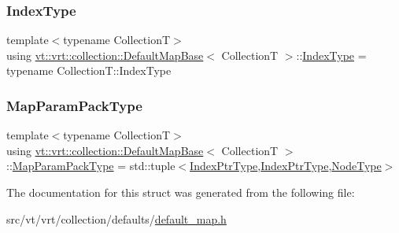 \subsubsection{\texorpdfstring{Index\+Type}{IndexType}}
{\footnotesize\ttfamily template$<$typename CollectionT$>$ \\
using \hyperlink{structvt_1_1vrt_1_1collection_1_1_default_map_base}{vt\+::vrt\+::collection\+::\+Default\+Map\+Base}$<$ CollectionT $>$\+::\hyperlink{structvt_1_1vrt_1_1collection_1_1_default_map_base_a88a872640fd6de6c456cb6eb9512665b}{Index\+Type} =  typename Collection\+T\+::\+Index\+Type}

\mbox{\label{structvt_1_1vrt_1_1collection_1_1_default_map_base_a94765cd0fe916d073a01eba6eb796f8e}} 
\subsubsection{\texorpdfstring{Map\+Param\+Pack\+Type}{MapParamPackType}}
{\footnotesize\ttfamily template$<$typename CollectionT$>$ \\
using \hyperlink{structvt_1_1vrt_1_1collection_1_1_default_map_base}{vt\+::vrt\+::collection\+::\+Default\+Map\+Base}$<$ CollectionT $>$\+::\hyperlink{structvt_1_1vrt_1_1collection_1_1_default_map_base_a94765cd0fe916d073a01eba6eb796f8e}{Map\+Param\+Pack\+Type} =  std\+::tuple$<$\hyperlink{structvt_1_1vrt_1_1collection_1_1_default_map_base_a0a2460c532fc180c1aeb8b3b5d0df59e}{Index\+Ptr\+Type},\hyperlink{structvt_1_1vrt_1_1collection_1_1_default_map_base_a0a2460c532fc180c1aeb8b3b5d0df59e}{Index\+Ptr\+Type},\hyperlink{namespacevt_a866da9d0efc19c0a1ce79e9e492f47e2}{Node\+Type}$>$}



The documentation for this struct was generated from the following file\+:\begin{DoxyCompactItemize}
\item 
src/vt/vrt/collection/defaults/\hyperlink{default__map_8h}{default\+\_\+map.\+h}\end{DoxyCompactItemize}
